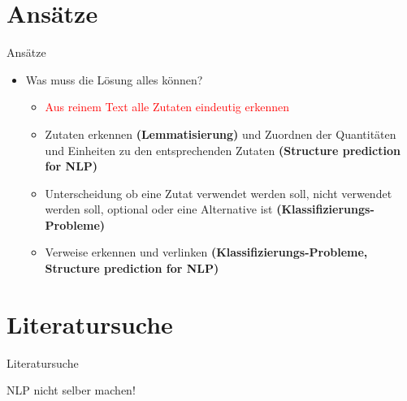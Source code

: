 \documentclass[12pt]{beamer}
\begin{document}
\section{Ansätze}
\begin{frame}{Ansätze}
	\begin{itemize}
		\item Was muss die Lösung alles können?
		\begin{itemize}
			\item \textcolor{red}{Aus reinem Text alle Zutaten eindeutig erkennen}
			\item Zutaten erkennen \textbf{(Lemmatisierung)} und Zuordnen der Quantitäten und Einheiten zu den entsprechenden Zutaten \textbf{(Structure prediction for NLP)}
			\item Unterscheidung ob eine Zutat verwendet werden soll, nicht verwendet werden soll, optional oder eine Alternative ist \textbf{(Klassifizierungs-Probleme)}
			\item Verweise erkennen und verlinken \textbf{(Klassifizierungs-Probleme, Structure prediction for NLP)}
		\end{itemize}
	\end{itemize}
\end{frame}

\section{Literatursuche}
\begin{frame}{Literatursuche}
	\printbibliography[heading=none]
\end{frame}

\begin{frame}
	NLP nicht selber machen!
\end{frame}
\end{document}
